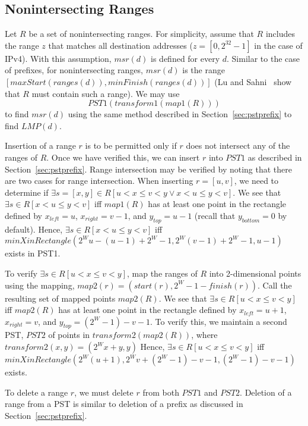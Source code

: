 \subsection{Nonintersecting Ranges}\label{sec:non}
Let $R$ be a set of nonintersecting ranges.
For simplicity, assume that
$R$ includes the range $z$ that matches all destination addresses
($z = [0, 2^{32} -1]$ in the case of IPv4).
With this assumption, $msr(d)$ is defined for every $d$.
Similar to the case of prefixes, for nonintersecting ranges,
$msr(d)$ is the range
$[maxStart(ranges(d)), minFinish(ranges(d))]$ (Lu and Sahni~\cite{lu}
show that $R$ must contain such a range).
We may use
$$PST1(transform1(map1(R)))$$
to find $msr(d)$ using the same method
described
in Section~\ref{sec:pstprefix} to find $LMP(d)$.

Insertion of a range $r$ is to be permitted only if $r$ does
not intersect any of the ranges of $R$. Once we have verified this, we can
insert $r$ into $PST1$ as described in Section~\ref{sec:pstprefix}.
Range intersection may be verified by noting that there are two
cases for range intersection.
When inserting $r = [u,v]$, we need to determine if $\exists s = [x,y] \in R [
u <  x \leq v < y \vee
x < u \leq y < v]$. 
We see that $\exists s \in R [x < u \leq y < v]$ iff $map1(R)$ has at
least one point
in the rectangle defined by $x_{left} = u$, $x_{right} = v - 1$,
and $y_{top} = u - 1$ (recall that $y_{bottom} = 0$ by default).
Hence,
$\exists s \in R [x < u \leq y < v]$ iff
$minXinRectangle(2^W u - (u - 1) + 2^W - 1, 2^W (v - 1) + 2^W - 1, u - 1)$
exists in PST1.

To verify $\exists s \in R [u < x \leq v < y]$, map the ranges of $R$ into
2-dimensional points using the mapping, $map2(r)
= (start(r), 2^W - 1 - finish(r))$. Call the
resulting set of mapped points $map2(R)$.
We see that $\exists s \in R [u < x \leq v < y]$
iff $map2(R)$ has at
least one point
in the rectangle defined by $x_{left} = u+1$, $x_{right} = v$,
and $y_{top} = (2^W - 1) - v - 1$.
To verify this, we maintain a second PST, $PST2$ of points in $transform2(map2(R))$,
where $transform2(x,y) = (2^W x + y,y)$
Hence,
$\exists s \in R [u < x \leq v < y]$ iff
$minXinRectangle(2^W (u + 1), 2^W v + (2^W - 1) - v - 1,  (2^W - 1) -v - 1)$
exists.


To delete a range $r$, we must delete $r$ from both $PST1$ and $PST2$.
Deletion of a range from a PST is similar to deletion of a prefix
as discussed in Section~\ref{sec:pstprefix}.  


